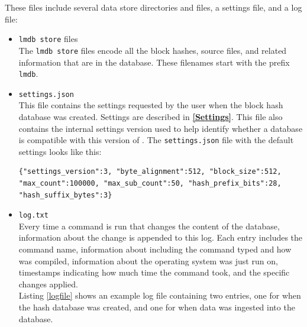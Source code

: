 \documentclass[11pt,fleqn]{article} %
\begin{document}
These files include several data store directories and files, a settings file, and a log file:

\begin{itemize}
\item \texttt{lmdb store} files \\
The \texttt{lmdb store} files encode all the block hashes, source files, and related information that are in the database. These filenames start with the prefix \verb+lmdb+.

\item \texttt{settings.json} \\
This file contains the settings requested by the user when the block hash database was created. Settings are described in \textbf{\autoref{Settings}}. This file also contains the internal \hdb settings version used to help \hdb identify whether a database is compatible with this version of \hdb. The \texttt{settings.json} file with the default settings looks like this:

\begingroup
\footnotesize
\begin{Verbatim}[fontfamily=courier]
{"settings_version":3, "byte_alignment":512, "block_size":512,
"max_count":100000, "max_sub_count":50, "hash_prefix_bits":28,
"hash_suffix_bytes":3}
\end{Verbatim}
\endgroup

\item \texttt{log.txt} \\
Every time a command is run that changes the content of the database, information about the change is appended to this log.  Each entry includes the command name, information about \hdb including the command typed and how \hdb was compiled, information about the operating system \hdb was just run on, timestamps indicating how much time the command took, and the specific \hdb changes applied.\\

Listing \ref{logfile} shows an example log file containing two entries, one for when the hash database was created, and one for when data was ingested into the database.


\end{itemize}
\end{document}
